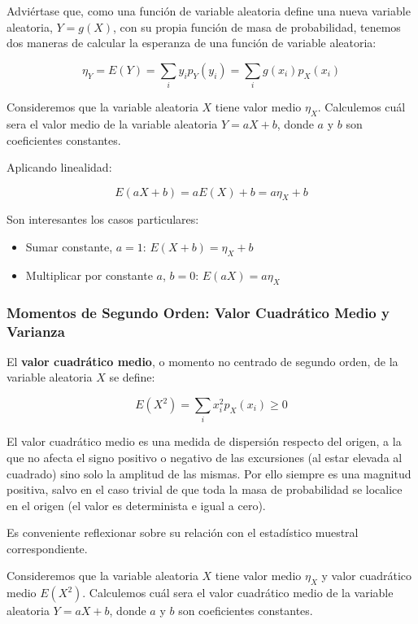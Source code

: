 \documentclass[11pt]{article}
\providecommand{\tightlist}{%
      \setlength{\itemsep}{0pt}\setlength{\parskip}{0pt}}
\begin{document}
Adviértase que, como una función de variable aleatoria define una nueva
variable aleatoria, \(Y=g(X)\), con su propia función de masa de
probabilidad, tenemos dos maneras de calcular la esperanza de una
función de variable aleatoria:

\[\eta_Y = E(Y)=\sum_i y_ip_Y(y_i) = \sum_i g(x_i)p_X(x_i)\]

    Consideremos que la variable aleatoria \(X\) tiene valor medio
\(\eta_X\). Calculemos cuál sera el valor medio de la variable aleatoria
\(Y = aX+b\), donde \(a\) y \(b\) son coeficientes constantes.

Aplicando linealidad:

\[E(aX+b) = aE(X)+b = a\eta_X + b\]

Son interesantes los casos particulares:

\begin{itemize}
\tightlist
\item
  Sumar constante, \(a=1\): \(E(X+b) = \eta_X + b\)
\item
  Multiplicar por constante \(a\), \(b=0\): \(E(aX) = a\eta_X\)
\end{itemize}

    \hypertarget{momentos-de-segundo-orden-valor-cuadruxe1tico-medio-y-varianza}{%
\subsubsection*{Momentos de Segundo Orden: Valor Cuadrático Medio y
Varianza}\label{momentos-de-segundo-orden-valor-cuadruxe1tico-medio-y-varianza}}

El \textbf{valor cuadrático medio}, o momento no centrado de segundo
orden, de la variable aleatoria \(X\) se define:

\[E(X^2)=\sum_i x_i^2p_X(x_i) \geq 0\]

El valor cuadrático medio es una medida de dispersión respecto del
origen, a la que no afecta el signo positivo o negativo de las
excursiones (al estar elevada al cuadrado) sino solo la amplitud de las
mismas. Por ello siempre es una magnitud positiva, salvo en el caso
trivial de que toda la masa de probabilidad se localice en el origen (el
valor es determinista e igual a cero).

Es conveniente reflexionar sobre su relación con el estadístico muestral
correspondiente.

    Consideremos que la variable aleatoria \(X\) tiene valor medio
\(\eta_X\) y valor cuadrático medio \(E(X^2)\). Calculemos cuál sera el
valor cuadrático medio de la variable aleatoria \(Y = aX+b\), donde
\(a\) y \(b\) son coeficientes constantes.
\end{document}
